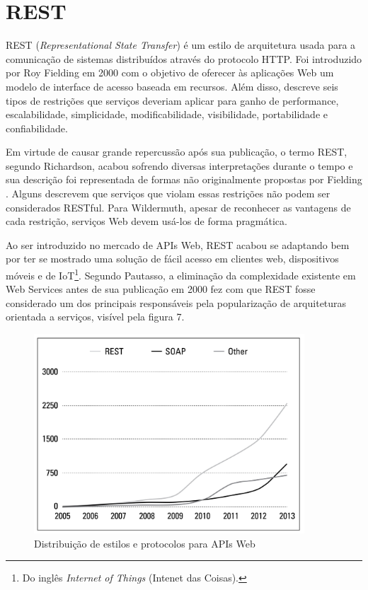 \section{REST}

REST (\textit{Representational State Transfer}) é um estilo de arquitetura usada para a comunicação de sistemas distribuídos através do protocolo HTTP. Foi introduzido por Roy Fielding em 2000 com o objetivo de oferecer às aplicações Web um modelo de interface de acesso baseada em recursos. Além disso, descreve seis tipos de restrições que serviços deveriam aplicar para ganho de performance, escalabilidade, simplicidade, modificabilidade, visibilidade, portabilidade e confiabilidade.

Em virtude de causar grande repercussão após sua publicação, o termo REST, segundo Richardson, acabou sofrendo diversas interpretações durante o tempo e sua descrição foi representada de formas não originalmente propostas por Fielding \cite{RichardsonEtAl2013}. Alguns descrevem que serviços que violam essas restrições não podem ser considerados RESTful. Para Wildermuth, apesar de reconhecer as vantagens de cada restrição, serviços Web devem usá-los de forma pragmática. \cite{Wildermuth2015}

Ao ser introduzido no mercado de APIs Web, REST acabou se adaptando bem por ter se mostrado uma solução de fácil acesso em clientes web, dispositivos móveis e de IoT\footnote{
  Do inglês \textit{Internet of Things} (Intenet das Coisas).
}. Segundo Pautasso, a eliminação da complexidade existente em Web Services antes de sua publicação em 2000 fez com que REST fosse considerado um dos principais responsáveis pela popularização de arquiteturas orientada a serviços, visível pela figura 7. \cite{PautassoEtAl2008}

\begin{figure}[H]
  \centering    \includegraphics[width=0.9\textwidth,height=\textheight,keepaspectratio]{figuras/api-styles.jpg}
  \caption{Distribuição de estilos e protocolos para APIs Web}
\end{figure}


